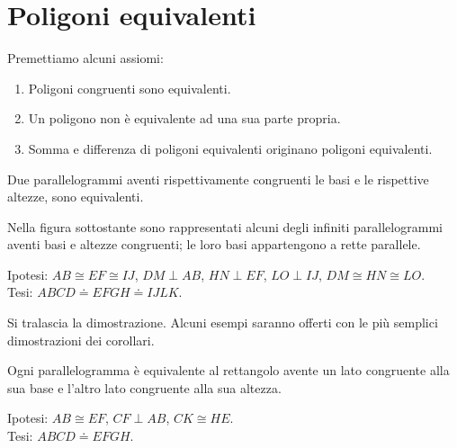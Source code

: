 \section{Poligoni equivalenti}
\label{sect:poligoni_equivalenti}

Premettiamo alcuni assiomi:
\nopagebreak
\begin{enumerate}
\item Poligoni congruenti sono equivalenti.
\item Un poligono non è equivalente ad una sua parte propria.
\item Somma e differenza di poligoni equivalenti originano poligoni 
equivalenti.
\end{enumerate}

\begin{teorema}\label{teo:7.1}
Due parallelogrammi aventi rispettivamente congruenti le basi e le 
rispettive altezze, sono equivalenti.
\end{teorema}

Nella figura sottostante sono rappresentati alcuni degli infiniti 
parallelogrammi aventi basi e altezze congruenti; le loro basi 
appartengono a rette parallele.

\noindent Ipotesi: $AB\cong EF\cong IJ$, $DM\perp AB$, $HN\perp EF$, 
$LO\perp IJ$, $DM\cong HN\cong LO$.\\
Tesi: $ABCD\doteq EFGH\doteq IJLK$.\\

\begin{figure*}[!htb]
  
\centering
\end{figure*}

Si tralascia la dimostrazione. Alcuni esempi saranno offerti con le più 
semplici dimostrazioni dei corollari.
 
\begin{corollario}\label{cor:7.1}
Ogni parallelogramma è equivalente al rettangolo avente un lato 
congruente alla sua base e l'altro lato congruente alla sua altezza.
\end{corollario}

\noindent Ipotesi: $AB\cong EF$, $CF\perp AB$, $CK\cong HE$.\\
Tesi: $ABCD\doteq EFGH$.

\begin{figure*}[!htb]
  \centering
\end{figure*}

